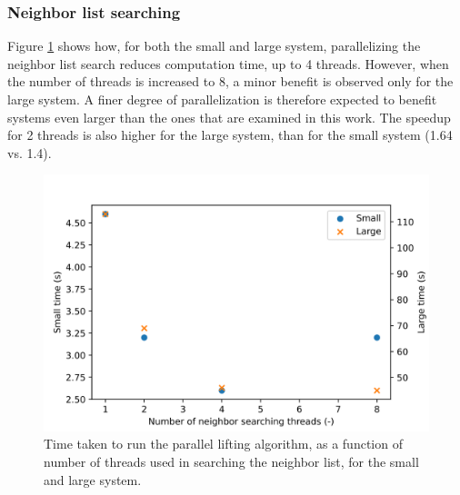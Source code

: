 \documentclass{article}
\begin{document}
\subsubsection{Neighbor list searching}
Figure \ref{fig:NeighbourSearching} shows how, for both the small and large system, parallelizing the neighbor list search reduces computation time, up to 4 threads. However, when the number of threads is increased to 8, a minor benefit is observed only for the large system. A finer degree of parallelization is therefore expected to benefit systems even larger than the ones that are examined in this work. The speedup for 2 threads is also higher for the large system, than for the small system (1.64 vs. 1.4).  
\begin{figure}[htp!]
    \includegraphics[scale=0.8]{NeighbourSearching.png}
    \caption{Time taken to run the parallel lifting algorithm, as a function of number of threads used in searching the neighbor list, for the small and large system.}
    \centering
    \label{fig:NeighbourSearching}
\end{figure}
\end{document}
